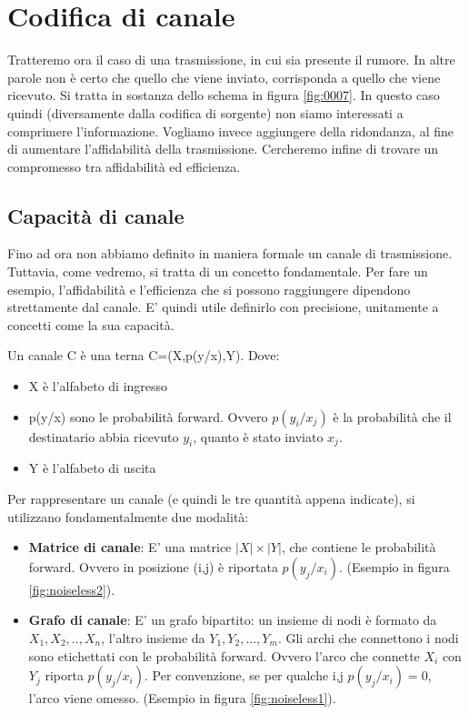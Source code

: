 \chapter{Codifica di canale}
Tratteremo ora il caso di una trasmissione, in cui sia presente il rumore. In altre parole non è certo che quello che viene inviato, 
corrisponda a quello che viene ricevuto. Si tratta in sostanza dello schema in figura \ref{fig:0007}.
In questo caso quindi (diversamente dalla codifica di sorgente) non siamo interessati a comprimere l'informazione. Vogliamo invece 
aggiungere della ridondanza, al fine di aumentare l'affidabilità della trasmissione.
Cercheremo infine di trovare un compromesso tra affidabilità ed efficienza.

\section{Capacità di canale}
Fino ad ora non abbiamo definito in maniera formale un canale di trasmissione. Tuttavia, come vedremo, si tratta di un concetto fondamentale. Per fare un esempio, l'affidabilità e l'efficienza che si possono raggiungere dipendono strettamente dal canale.
E' quindi utile definirlo con precisione, unitamente a concetti come la sua capacità.

\begin{definizione}[Canale]
 Un canale C è una terna C=(X,p(y/x),Y). Dove:
 \begin{itemize}
  \item X è l'alfabeto di ingresso
  \item p(y/x) sono le probabilità forward. Ovvero $p(y_i/x_j)$ è la probabilità che il destinatario 
        abbia ricevuto $y_i$, quanto è stato inviato $x_j$.
  \item Y è l'alfabeto di uscita
 \end{itemize}
\end{definizione}

\noindent
Per rappresentare un canale (e quindi le tre quantità appena indicate), si utilizzano fondamentalmente due modalità:
\begin{itemize}
 \item \textbf{Matrice di canale}: E' una matrice $|X| \times |Y|$, che contiene le probabilità forward.
                          Ovvero in posizione (i,j) è riportata $p(y_j/x_i)$. (Esempio in figura \ref{fig:noiseless2}).
 \item \textbf{Grafo di canale}: E' un grafo bipartito: un insieme di nodi è formato da $X_1,X_2,..,X_n$, l'altro insieme 
                        da $Y_1,Y_2,...,Y_m$.
                        Gli archi che connettono i nodi sono etichettati con le probabilità forward. Ovvero l'arco che connette
                        $X_i$ con $Y_j$ riporta $p(y_j/x_i)$. Per convenzione, se per qualche i,j $p(y_j/x_i)=0$, l'arco viene omesso.
                       (Esempio in figura \ref{fig:noiseless1}).
\end{itemize}

